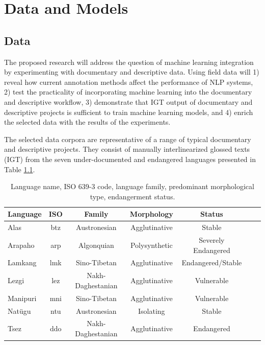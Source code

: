 \chapter{Data and Models}
\label{chap:datamodels}

\section{Data}

The proposed research will address the question of machine learning integration by experimenting with documentary and descriptive data. Using field data will 1) reveal how current annotation methods affect the performance of NLP systems, 2) test the practicality of incorporating machine learning into the documentary and descriptive workflow, 3) demonstrate that IGT output of documentary and descriptive projects is sufficient to train machine learning models, and 4) enrich the selected data with the results of the experiments.

The selected data corpora are representative of a range of typical documentary and descriptive projects. They consist of manually interlinearized glossed texts (IGT) from the seven under-documented and endangered languages presented in Table \ref{tab:langs}.   

\bgroup
\def\arraystretch{1.25}
\begin{table}[h!]
    \begin{center}
    \begin{tabular}{lcccccc} 
    \textbf{Language} & \textbf{ISO} & \textbf{Family} & \textbf{Morphology} & \textbf{Status} \\
    \hline
    Alas & btz & Austronesian & Agglutinative & Stable \\
    Arapaho & arp & Algonquian & Polysynthetic & Severely Endangered  \\
    Lamkang & lmk & Sino-Tibetan & Agglutinative & Endangered/Stable   \\
    Lezgi & lez & Nakh-Daghestanian & Agglutinative & Vulnerable \\
    Manipuri & mni & Sino-Tibetan & Agglutinative & Vulnerable  \\
    Natügu & ntu & Austronesian & Isolating & Stable \\
    Tsez & ddo & Nakh-Daghestanian & Agglutinative & Endangered   \\
    
	\end{tabular}
	\caption[Data]{Language name, ISO 639-3 code, language family, predominant morphological type, endangerment status.}
	\label{tab:langs}
\end{center}
\end{table}


